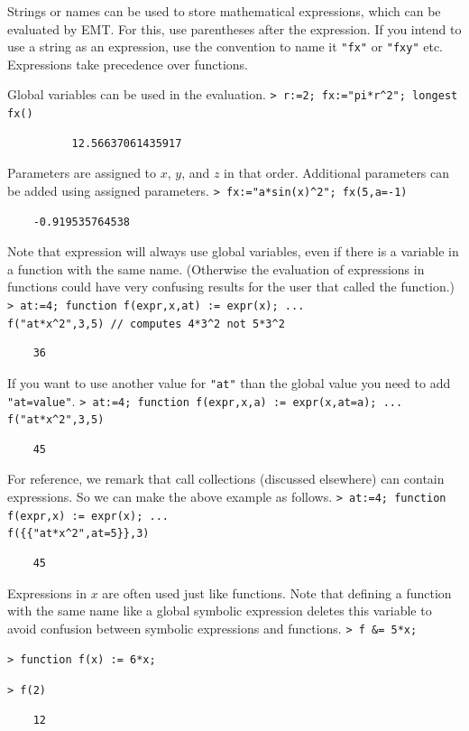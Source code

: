 \documentclass[11pt, a4paper]{article}
\newcommand{\emtcmd}[1]{\noindent\texttt{\textcolor{emtcommand}{>}\ #1}\par\smallskip}
\begin{document}
Strings or names can be used to store mathematical expressions, which can be evaluated by EMT. For this, use parentheses after the expression. If you intend to use a string as an expression, use the convention to name it \texttt{"fx"} or \texttt{"fxy"} etc. Expressions take precedence over functions.

Global variables can be used in the evaluation.
\emtcmd{r:=2; fx:="pi*r\^{}2"; longest fx()}
\begin{verbatim}
          12.56637061435917
\end{verbatim}

Parameters are assigned to $x$, $y$, and $z$ in that order. Additional parameters can be added using assigned parameters.
\emtcmd{fx:="a*sin(x)\^{}2"; fx(5,a=-1)}
\begin{verbatim}
    -0.919535764538
\end{verbatim}

Note that expression will always use global variables, even if there is a variable in a function with the same name. (Otherwise the evaluation of expressions in functions could have very confusing results for the user that called the function.)
\emtcmd{at:=4; function f(expr,x,at) := expr(x); ... \\
\hspace*{1em} f("at*x\^{}2",3,5) \textcolor{emtcomment}{// computes 4*3\^{}2 not 5*3\^{}2}}
\begin{verbatim}
    36
\end{verbatim}

If you want to use another value for \texttt{"at"} than the global value you need to add \texttt{"at=value"}.
\emtcmd{at:=4; function f(expr,x,a) := expr(x,at=a); ... \\
\hspace*{1em} f("at*x\^{}2",3,5)}
\begin{verbatim}
    45
\end{verbatim}

For reference, we remark that call collections (discussed elsewhere) can contain expressions. So we can make the above example as follows.
\emtcmd{at:=4; function f(expr,x) := expr(x); ... \\
\hspace*{1em} f(\{\{"at*x\^{}2",at=5\}\},3)}
\begin{verbatim}
    45
\end{verbatim}

Expressions in $x$ are often used just like functions. Note that defining a function with the same name like a global symbolic expression deletes this variable to avoid confusion between symbolic expressions and functions.
\emtcmd{f \&= 5*x;}
\emtcmd{function f(x) := 6*x;}
\emtcmd{f(2)}
\begin{verbatim}
    12
\end{verbatim}
\end{document}
